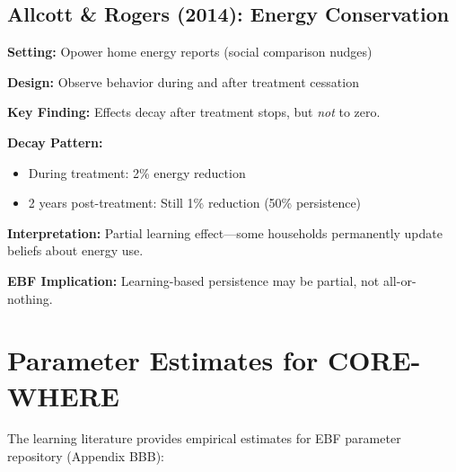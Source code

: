 \documentclass[11pt, a4paper]{article}
\begin{document}
\subsection{Allcott \& Rogers (2014): Energy Conservation}

\begin{tcolorbox}[colback=gray!5!white, colframe=gray!75!black,
    title=Allcott \& Rogers (2014): Persistence of Social Norm Messages]

\textbf{Setting:} Opower home energy reports (social comparison nudges)

\textbf{Design:} Observe behavior during and after treatment cessation

\textbf{Key Finding:} Effects decay after treatment stops, but \textit{not} to zero.

\textbf{Decay Pattern:}
\begin{itemize}[nosep]
    \item During treatment: 2\% energy reduction
    \item 2 years post-treatment: Still 1\% reduction (50\% persistence)
\end{itemize}

\textbf{Interpretation:} Partial learning effect---some households permanently update beliefs about energy use.

\textbf{EBF Implication:} Learning-based persistence may be partial, not all-or-nothing.

\end{tcolorbox}


\section{Parameter Estimates for CORE-WHERE}
\label{sec:lrn-parameters}

The learning literature provides empirical estimates for EBF parameter repository (Appendix BBB):
\end{document}
